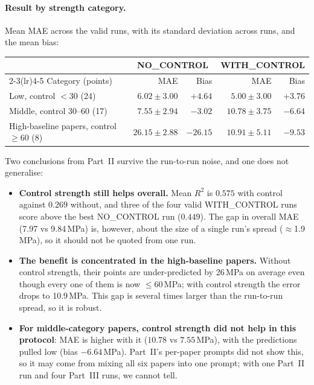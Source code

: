 \documentclass[11pt]{article}
\newcommand{\R}{$R^2$}
\begin{document}
\paragraph{Result by strength category.} Mean MAE across the valid runs, with its
standard deviation across runs, and the mean bias:

\begin{center}\small
\begin{tabular}{lrrrr}
\toprule
& \multicolumn{2}{c}{NO\_CONTROL} & \multicolumn{2}{c}{WITH\_CONTROL} \\
\cmidrule(lr){2-3}\cmidrule(lr){4-5}
Category (points) & MAE & Bias & MAE & Bias \\
\midrule
Low, control $<30$ (24) & $6.02\pm3.00$ & $+4.64$ & $5.00\pm3.00$ & $+3.76$ \\
Middle, control $30$--$60$ (17) & $7.55\pm2.94$ & $-3.02$ & $10.78\pm3.75$ & $-6.64$ \\
High-baseline papers, control $\geq60$ (8) & $26.15\pm2.88$ & $-26.15$ & $\mathbf{10.91\pm5.11}$ & $-9.53$ \\
\bottomrule
\end{tabular}
\end{center}

\noindent Two conclusions from Part~II survive the run-to-run noise, and one does not
generalise:
\begin{itemize}\itemsep2pt
  \item \textbf{Control strength still helps overall.} Mean \R{} is $0.575$ with control
        against $0.269$ without, and three of the four valid WITH\_CONTROL runs score
        above the best NO\_CONTROL run ($0.449$). The gap in overall MAE (7.97 vs 9.84\,MPa)
        is, however, about the size of a single run's spread ($\approx$1.9\,MPa), so it
        should not be quoted from one run.
  \item \textbf{The benefit is concentrated in the high-baseline papers.} Without
        control strength, their points are under-predicted by 26\,MPa on average even
        though every one of them is now $\leq60$\,MPa; with control strength the error
        drops to 10.9\,MPa. This gap is several times larger than the run-to-run spread,
        so it is robust.
  \item \textbf{For middle-category papers, control strength did not help in this
        protocol}: MAE is higher with it ($10.78$ vs $7.55$\,MPa), with the predictions
        pulled low (bias $-6.64$\,MPa). Part~II's per-paper prompts did not show this, so
        it may come from mixing all six papers into one prompt; with one Part~II run and
        four Part~III runs, we cannot tell.
\end{itemize}
\end{document}
